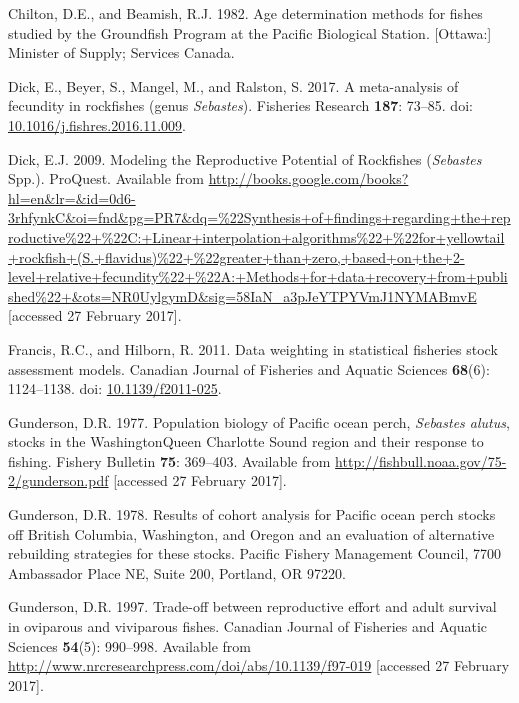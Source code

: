 \documentclass[12pt,]{article}
\begin{document}
\hypertarget{ref-chilton_age_1982}{}
Chilton, D.E., and Beamish, R.J. 1982. Age determination methods for
fishes studied by the Groundfish Program at the Pacific Biological
Station. {[}Ottawa:{]} Minister of Supply; Services Canada.

\hypertarget{ref-dick_meta-analysis_2017}{}
Dick, E., Beyer, S., Mangel, M., and Ralston, S. 2017. A meta-analysis
of fecundity in rockfishes (genus \emph{Sebastes}). Fisheries Research
\textbf{187}: 73--85. doi:
\href{https://doi.org/10.1016/j.fishres.2016.11.009}{10.1016/j.fishres.2016.11.009}.

\hypertarget{ref-dick_modeling_2009}{}
Dick, E.J. 2009. Modeling the Reproductive Potential of Rockfishes
(\emph{Sebastes} Spp.). ProQuest. Available from
\url{http://books.google.com/books?hl=en\&lr=\&id=0d6-3rhfynkC\&oi=fnd\&pg=PR7\&dq=\%22Synthesis+of+findings+regarding+the+reproductive\%22+\%22C:+Linear+interpolation+algorithms\%22+\%22for+yellowtail+rockfish+(S.+flavidus)\%22+\%22greater+than+zero,+based+on+the+2-level+relative+fecundity\%22+\%22A:+Methods+for+data+recovery+from+published\%22+\&ots=NR0UylgymD\&sig=58IaN_a3pJeYTPYVmJ1NYMABmvE}
{[}accessed 27 February 2017{]}.

\hypertarget{ref-francis_data_2011}{}
Francis, R.C., and Hilborn, R. 2011. Data weighting in statistical
fisheries stock assessment models. Canadian Journal of Fisheries and
Aquatic Sciences \textbf{68}(6): 1124--1138. doi:
\href{https://doi.org/10.1139/f2011-025}{10.1139/f2011-025}.

\hypertarget{ref-gunderson_population_1977}{}
Gunderson, D.R. 1977. Population biology of Pacific ocean perch,
\emph{Sebastes alutus}, stocks in the WashingtonQueen Charlotte Sound
region and their response to fishing. Fishery Bulletin \textbf{75}:
369--403. Available from
\url{http://fishbull.noaa.gov/75-2/gunderson.pdf} {[}accessed 27
February 2017{]}.

\hypertarget{ref-gunderson_results_1978}{}
Gunderson, D.R. 1978. Results of cohort analysis for Pacific ocean perch
stocks off British Columbia, Washington, and Oregon and an evaluation of
alternative rebuilding strategies for these stocks. Pacific Fishery
Management Council, 7700 Ambassador Place NE, Suite 200, Portland, OR
97220.

\hypertarget{ref-gunderson_trade-off_1997}{}
Gunderson, D.R. 1997. Trade-off between reproductive effort and adult
survival in oviparous and viviparous fishes. Canadian Journal of
Fisheries and Aquatic Sciences \textbf{54}(5): 990--998. Available from
\url{http://www.nrcresearchpress.com/doi/abs/10.1139/f97-019}
{[}accessed 27 February 2017{]}.
\end{document}
